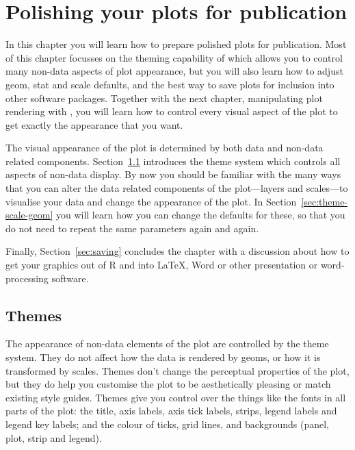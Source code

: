 

% 


\chapter{Polishing your plots for publication}
\label{cha:polishing}

In this chapter you will learn how to prepare polished plots for publication.  Most of this chapter focusses on the theming capability of \ggplot which allows you to control many non-data aspects of plot appearance, but you will also learn how to adjust geom, stat and scale defaults, and the best way to save plots for inclusion into other software packages.  Together with the next chapter, manipulating plot rendering with , you will learn how to control every visual aspect of the plot to get exactly the appearance that you want.

The visual appearance of the plot is determined by both data and non-data related components.  Section~\ref{sec:themes} introduces the theme system which controls all aspects of non-data display.  By now you should be familiar with the many ways that you can alter the data related components of the plot---layers and scales---to visualise your data and change the appearance of the plot.  In Section~\ref{sec:theme-scale-geom} you will learn how you can change the defaults for these, so that you do not need to repeat the same parameters again and again.

Finally, Section~\ref{sec:saving} concludes the chapter with a discussion about how to get your graphics out of R and into \LaTeX, Word or other presentation or word-processing software.


\section{Themes} 
\label{sec:themes}

The appearance of non-data elements of the plot are controlled by the theme system.  They do not affect how the data is rendered by geoms, or how it is transformed by scales.  Themes don't change the perceptual properties of the plot, but they do help you customise the plot to be aesthetically pleasing or match existing style guides.  Themes give you control over the things like the  fonts in all parts of the plot: the title, axis labels, axis tick labels, strips, legend labels and legend key labels; and the colour of ticks, grid lines, and backgrounds (panel, plot, strip and legend).

